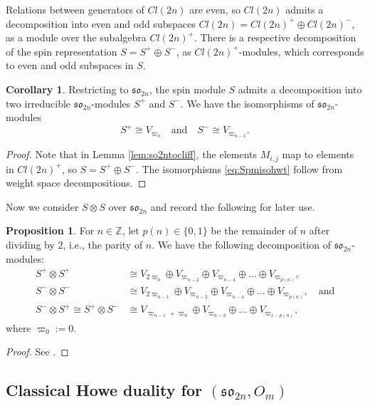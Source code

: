\documentclass[10pt]{amsart}
\numberwithin{equation}{section}
\theoremstyle{definition}
\newtheorem{corollary}[theorem]{Corollary}
\newtheorem{proposition}[theorem]{Proposition}
\newcommand{\son}[1][2n]{\mathfrak{so}_{#1}}
\newcommand{\ot}{\otimes}
\begin{document}
Relations between generators of $Cl(2n)$ are even, so $Cl(2n)$ admits a decomposition into even and odd subspaces $Cl(2n)=Cl(2n)^+\oplus Cl(2n)^-$, as a module over the subalgebra $Cl(2n)^+$. There is a respective decomposition of the spin representation $S=S^+\oplus S^-$, as $Cl(2n)^+$-modules, which corresponds to even and odd subspaces in $S$.

\begin{corollary}
    Restricting to $\son[2n]$, the spin module $S$ admits a decomposition into two irreducible $\son$-modules $S^+$ and $S^-$. We have the isomorphisms of $\son$-modules
    \begin{equation}\label{eq:Spmisohwt}
    S^+ \cong V_{\varpi_n}\quad \text{and} \quad S^-\cong V_{\varpi_{n-1}}.
    \end{equation}
\end{corollary}
\begin{proof}
    Note that in Lemma \ref{lem:so2ntocliff}, the elements $M_{i,j}$ map to elements in $Cl(2n)^+$, so $S=S^+\oplus S^-$. The isomorphisms \eqref{eq:Spmisohwt} follow from weight space decompositions.
\end{proof}

Now we consider $S\ot S$ over $\son[2n]$ and record the following for later use.

\begin{proposition}\label{FH_decomposition}
For $n\in \mathbb{Z}$, let $p(n)\in \{0,1\}$ be the remainder of $n$ after dividing by $2$, i.e., the parity of $n$. We have the following decomposition of $\son$-modules:
\begin{align*}
    S^+\ot S^+ &\cong V_{2\varpi_n} \oplus V_{\varpi_{n-2}} \oplus V_{\varpi_{n-4}}\oplus \dots \oplus V_{\varpi_{p(n)}}, \\
    S^-\ot S^- &\cong V_{2\varpi_{n-1}} \oplus V_{\varpi_{n-2}} \oplus V_{\varpi_{n-4}}\oplus \dots \oplus V_{\varpi_{p(n)}}, \quad \text{and} \\
    S^-\otimes S^+ \cong S^+\ot S^- &\cong V_{\varpi_{n-1}+\varpi_{n}} \oplus V_{\varpi_{n-3}} \oplus \dots  \oplus V_{\varpi_{1-{p}(n)}},
\end{align*}
where $\varpi_0:=0$.
\end{proposition}
\begin{proof}
    See \cite[Exercise 23.31(b)]{FultonHarris}.
\end{proof}

\subsection{Classical Howe duality for $(\son[2n], O_m)$}
\end{document}
